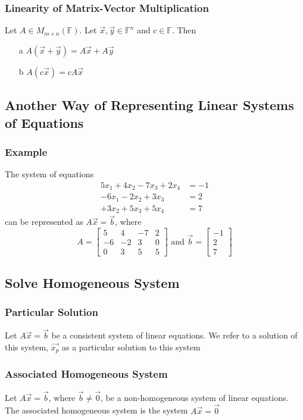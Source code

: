 \documentclass[12pt, letterpaper]{article}
\begin{document}
\subsubsection{Linearity of Matrix-Vector Multiplication}
Let $A\in M_{m\times n}(\mathbb{F})$. Let $\vec{x}, \vec{y}\in\mathbb{F}^n$ and $c\in\mathbb{F}$. Then 
\begin{itemize}
    \item[a] $A(\vec{x}+\vec{y}) = A\vec{x} + A\vec{y}$
    \item[b] $A(c\vec{x}) = cA\vec{x}$
\end{itemize}
\subsection{Another Way of Representing Linear Systems of Equations}
\subsubsection*{Example}
The system of equations 
\begin{align*}
    5x_1 +4x_2 -7x_3 +2x_4 &= -1 \\
    -6x_1 -2x_2 +3x_3  &= 2 \\
    +3x_2 +5x_3 +5x_4 &= 7
\end{align*}
can be represented as $A\vec{x} = \vec{b}$, where 
\[A = \begin{bmatrix}
    5 &4 &-7 &2 \\
    -6 &-2 &3 &0 \\
    0 &3 &5 &5 
\end{bmatrix} \text{ and } \vec{b} = \begin{bmatrix} -1 \\2 \\7 \end{bmatrix}\]
\subsection{Solve Homogeneous System}
\subsubsection{Particular Solution}
Let $A\vec{x} = \vec{b}$ be a consistent system of linear equations. We refer to a solution of this system, 
$\vec{x_p}$ as a particular solution to this system 
\subsubsection{Associated Homogeneous System}
Let $A\vec{x} = \vec{b}$, where $\vec{b}\neq \vec{0}$, be a non-homogeneous system of linear equations. 
The associated homogeneous system is the system $A\vec{x} = \vec{0}$
\end{document}

